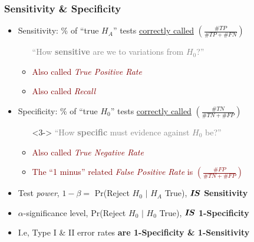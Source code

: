 \documentclass[xcolor={dvipsnames}]{beamer}
\begin{document}
\frame
{
\frametitle{Sensitivity \& Specificity}

\begin{itemize}
\item Sensitivity:  \% of ``true $H_A$''  tests \underline{correctly called} $\left(\frac{\#TP}{\#TP+\#FN}\right)$
\begin{itemize}
\item[] \textcolor{gray}{``How \textbf{sensitive} are we to variations from $H_0$?''}
\item[]
\item<2-> \textcolor{Maroon}{Also called \emph{True Positive Rate}}
\item<2-> \textcolor{Maroon}{Also called \emph{Recall}}
\end{itemize}
\item[]
\item<3-> Specificity:  \% of ``true $H_0$''  tests \underline{correctly called} $\left(\frac{\#TN}{\#TN + \#FP}\right)$
\begin{itemize}
\item[]<3-> \textcolor{gray}{``How \textbf{specific} must evidence against $H_0$ be?''}
\item[]
\item<4-> \textcolor{Maroon}{Also called \emph{True Negative Rate}}
\item<4-> \textcolor{Maroon}{The ``1 minus'' related \emph{False Positive Rate} is $\left(\frac{\#FP}{\#TN+\#FP}\right)$}
\end{itemize}
\item[]
\item<5-> Test \emph{power}, $1-\beta = $  Pr(Reject $H_0$ $|$ $H_A$ True), \textbf{${\boldsymbol I}\hspace{-.1em}{\boldsymbol S}$ Sensitivity} 
\item<5-> $\alpha$-significance level, Pr(Reject $H_0$ $|$ $H_0$ True), \textbf{${\boldsymbol I}\hspace{-.1em}{\boldsymbol S}$ 1-Specificity } 
\item<6-> I.e, Type I \& II error rates \textbf{are 1-Specificity \& 1-Sensitivity}
\end{itemize}
}
\end{document}
